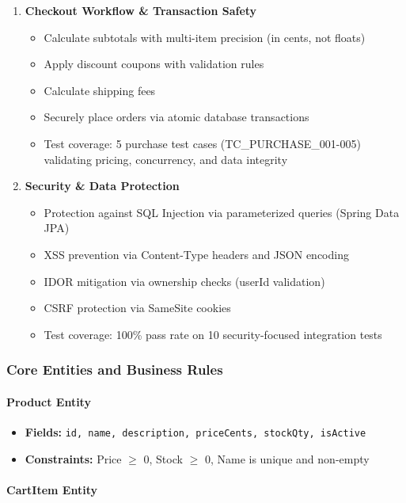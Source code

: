 \documentclass[11pt,a4paper]{article}
\begin{document}
\begin{enumerate}
    \item \textbf{Checkout Workflow \& Transaction Safety}
    \begin{itemize}
        \item Calculate subtotals with multi-item precision (in cents, not floats)
        \item Apply discount coupons with validation rules
        \item Calculate shipping fees
        \item Securely place orders via atomic database transactions
        \item Test coverage: 5 purchase test cases (TC\_PURCHASE\_001-005) validating pricing, concurrency, and data integrity
    \end{itemize}

    \item \textbf{Security \& Data Protection}
    \begin{itemize}
        \item Protection against SQL Injection via parameterized queries (Spring Data JPA)
        \item XSS prevention via Content-Type headers and JSON encoding
        \item IDOR mitigation via ownership checks (userId validation)
        \item CSRF protection via SameSite cookies
        \item Test coverage: 100\% pass rate on 10 security-focused integration tests
    \end{itemize}
\end{enumerate}

\subsubsection{Core Entities and Business Rules}

\paragraph{Product Entity}

\begin{itemize}
    \item \textbf{Fields:} \texttt{id, name, description, priceCents, stockQty, isActive}
    \item \textbf{Constraints:} Price $\geq$ 0, Stock $\geq$ 0, Name is unique and non-empty
\end{itemize}

\paragraph{CartItem Entity}
\end{document}
